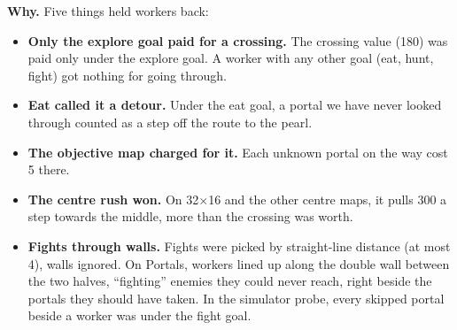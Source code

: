 \documentclass[11pt,a4paper]{article}
\begin{document}
\textbf{Why.} Five things held workers back:
\begin{itemize}
      \item \textbf{Only the explore goal paid for a crossing.} The crossing value (180) was paid only under the explore goal. A
            worker with any other goal (eat, hunt, fight) got nothing for going through.
      \item \textbf{Eat called it a detour.} Under the eat goal, a portal we have never looked through counted as a step off the
            route to the pearl.
      \item \textbf{The objective map charged for it.} Each unknown portal on the way cost 5 there.
      \item \textbf{The centre rush won.} On 32$\times$16 and the other centre maps, it pulls 300 a step towards the middle, more than
            the crossing was worth.
      \item \textbf{Fights through walls.} Fights were picked by straight-line distance (at most 4), walls ignored. On Portals,
            workers lined up along the double wall between the two halves, ``fighting'' enemies they could never reach, right
            beside the portals they should have taken. In the simulator probe, every skipped portal beside a worker was under the
            fight goal.
\end{itemize}
\end{document}
